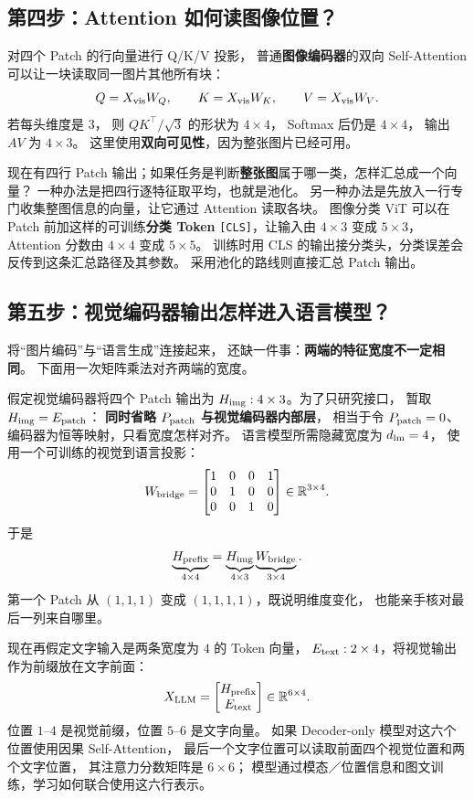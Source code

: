 \subsection{第四步：Attention 如何读图像位置？}

对四个 Patch 的行向量进行 Q/K/V 投影，
普通\textbf{图像编码器}的双向 Self-Attention
可以让一块读取同一图片其他所有块：
\[
Q=X_{\rm vis}W_Q,\qquad K=X_{\rm vis}W_K,\qquad V=X_{\rm vis}W_V.
\]
若每头维度是 $3$，
则 $QK^\top/\sqrt3$ 的形状为 $4\times4$，
Softmax 后仍是 $4\times4$，
输出 $AV$ 为 $4\times3$。
这里使用\textbf{双向可见性}，因为整张图片已经可用。

现在有四行 Patch 输出；如果任务是判断\textbf{整张图}属于哪一类，怎样汇总成一个向量？
一种办法是把四行逐特征取平均，也就是池化。
另一种办法是先放入一行专门收集整图信息的向量，让它通过 Attention 读取各块。
图像分类 ViT 可以在 Patch 前加这样的可训练\textbf{分类 Token}
\texttt{[CLS]}，让输入由 $4\times3$ 变成 $5\times3$，
Attention 分数由 $4\times4$ 变成 $5\times5$。
训练时用 CLS 的输出接分类头，分类误差会反传到这条汇总路径及其参数。
采用池化的路线则直接汇总 Patch 输出。

\subsection{第五步：视觉编码器输出怎样进入语言模型？}

将“图片编码”与“语言生成”连接起来，
还缺一件事：\textbf{两端的特征宽度不一定相同}。
下面用一次矩阵乘法对齐两端的宽度。

假定视觉编码器将四个 Patch 输出为
$H_{\rm img}:4\times3$。为了只研究接口，
暂取 $H_{\rm img}=E_{\rm patch}$：
\textbf{同时省略 $P_{\rm patch}$ 与视觉编码器内部层}，
相当于令 $P_{\rm patch}=0$、编码器为恒等映射，只看宽度怎样对齐。
语言模型所需隐藏宽度为 $d_{\rm lm}=4$，
使用一个可训练的视觉到语言投影：
\[
W_{\rm bridge}=
\begin{bmatrix}
1&0&0&1\\
0&1&0&0\\
0&0&1&0
\end{bmatrix}\in\mathbb{R}^{3\times4}.
\]
于是
\[
\underbrace{H_{\rm prefix}}_{4\times4}
=\underbrace{H_{\rm img}}_{4\times3}
\underbrace{W_{\rm bridge}}_{3\times4}.
\]
第一个 Patch 从 $(1,1,1)$ 变成
$(1,1,1,1)$，既说明维度变化，
也能亲手核对最后一列来自哪里。

现在再假定文字输入是两条宽度为 $4$ 的 Token 向量，
$E_{\rm text}:2\times4$，将视觉输出作为前缀放在文字前面：
\begin{equation}
\boxed{
X_{\rm LLM}=
\begin{bmatrix}H_{\rm prefix}\\E_{\rm text}\end{bmatrix}
\in\R^{6\times4}.}
\label{eq:vit-llm-bridge}
\end{equation}
位置 $1$--$4$ 是视觉前缀，位置 $5$--$6$ 是文字向量。
如果 Decoder-only 模型对这六个位置使用因果 Self-Attention，
最后一个文字位置可以读取前面四个视觉位置和两个文字位置，
其注意力分数矩阵是 $6\times6$；
模型通过模态／位置信息和图文训练，学习如何联合使用这六行表示。

